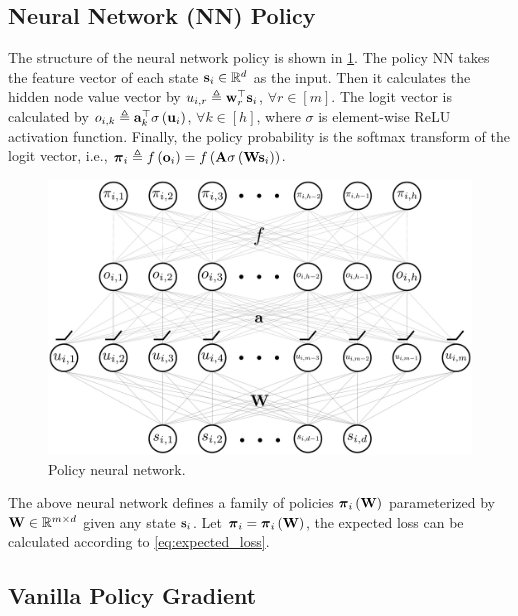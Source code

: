 \subsection{Neural Network (NN) Policy}

The structure of the neural network policy is shown in \cref{fig:nn_policy}. The policy NN takes the feature vector of each state ${\mathbf{s}}_i \in {\mathbb{R}}^d$ as the input. Then it calculates the hidden node value vector by $u_{i,r} \triangleq {\mathbf{w}}_r^\top {\mathbf{s}}_i$, $\forall r \in [m]$. The logit vector is calculated by $o_{i,k} \triangleq {\mathbf{a}}_k^\top \sigma\left( {\mathbf{u}}_i \right)$, $\forall k \in [h]$, where $\sigma$ is element-wise ReLU activation function. Finally, the policy probability is the softmax transform of the logit vector, i.e., ${\boldsymbol{\pi}}_i \triangleq f\left( {\mathbf{o}}_i \right) = f\left( {\mathbf{A}} \sigma\left( {\mathbf{W}} {\mathbf{s}}_i \right) \right)$. 
\begin{figure}[t]
\vskip 0.2in
\begin{center}
\centerline{\includegraphics[width=\columnwidth]{nn_policy.pdf}}
\caption{Policy neural network.}
\label{fig:nn_policy}
\end{center}
\vskip -0.2in
\end{figure}

The above neural network defines a family of policies ${\boldsymbol{\pi}}_i \left( {\mathbf{W}} \right)$ parameterized by ${\mathbf{W}} \in {\mathbb{R}}^{m \times d}$ given any state ${\mathbf{s}}_i$. Let ${\boldsymbol{\pi}}_i = {\boldsymbol{\pi}}_i \left( {\mathbf{W}} \right)$, the expected loss can be calculated according to \cref{eq:expected_loss}.

\subsection{Vanilla Policy Gradient}
\label{subsec:vanilla_policy_gradient}

